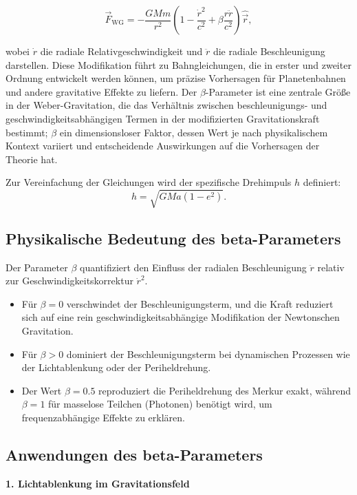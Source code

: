 \begin{equation}
\vec{F}_{\text{WG}} = -\frac{GMm}{r^2} \left(1 - \frac{\dot{r}^2}{c^2} + \beta \frac{r\ddot{r}}{c^2}\right) \hat{\vec{r}},
\end{equation}

wobei $\dot{r}$ die radiale Relativgeschwindigkeit und $\ddot{r}$ die radiale Beschleunigung darstellen. Diese Modifikation führt zu Bahngleichungen, die in
erster und zweiter Ordnung entwickelt werden können, um präzise Vorhersagen für Planetenbahnen und andere gravitative Effekte zu liefern. Der $\beta$-Parameter ist
eine zentrale Größe in der Weber-Gravitation, die das Verhältnis zwischen beschleunigungs- und geschwindigkeitsabhängigen Termen in der modifizierten
Gravitationskraft bestimmt; $\beta$ ein dimensionsloser Faktor, dessen Wert je nach physikalischem Kontext variiert und entscheidende Auswirkungen auf die Vorhersagen
der Theorie hat.

Zur Vereinfachung der Gleichungen wird der spezifische Drehimpuls $h$ definiert:
\begin{equation}
h = \sqrt{GMa(1 - e^2)}.
\end{equation}

\subsection{Physikalische Bedeutung des beta-Parameters}
Der Parameter $\beta$ quantifiziert den Einfluss der radialen Beschleunigung $\ddot{r}$ relativ zur Geschwindigkeitskorrektur $\dot{r}^2$.
\begin{itemize}
    \item Für $\beta=0$ verschwindet der Beschleunigungsterm, und die Kraft reduziert sich auf eine rein geschwindigkeitsabhängige Modifikation der Newtonschen Gravitation.
    \item Für $\beta>0$ dominiert der Beschleunigungsterm bei dynamischen Prozessen wie der Lichtablenkung oder der Periheldrehung.
    \item Der Wert $\beta=0.5$ reproduziert die Periheldrehung des Merkur exakt, während $\beta=1$ für masselose Teilchen (Photonen) benötigt wird, um frequenzabhängige Effekte zu erklären.
\end{itemize}

\subsection{Anwendungen des beta-Parameters}
\textbf{1. Lichtablenkung im Gravitationsfeld}

